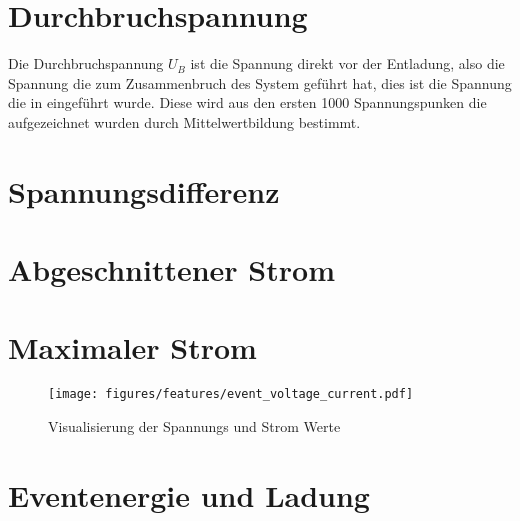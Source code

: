 \section{Durchbruchspannung}
\label{sec:breakdownvoltage}
Die Durchbruchspannung \(U_B\) ist die Spannung direkt vor der Entladung, also die Spannung die zum Zusammenbruch des System geführt hat, dies ist die Spannung die in  eingeführt wurde. Diese wird aus den ersten 1000 Spannungspunken die aufgezeichnet wurden durch Mittelwertbildung bestimmt. 

\section{Spannungsdifferenz}
\label{sec:voltage_drop}

\section{Abgeschnittener Strom}
\label{sec:cutoffcurrent}

\section{Maximaler Strom}
\label{sec:maxcurrent}

\begin{figure}[H]
  \centering
  \texttt{[image: figures/features/event\_voltage\_current.pdf]}
  \caption{Visualisierung der Spannungs und Strom Werte}
  \label{fig:event_voltage_current}
\end{figure}

\section{Eventenergie und Ladung}
\label{sec:eventenergy_charge}







